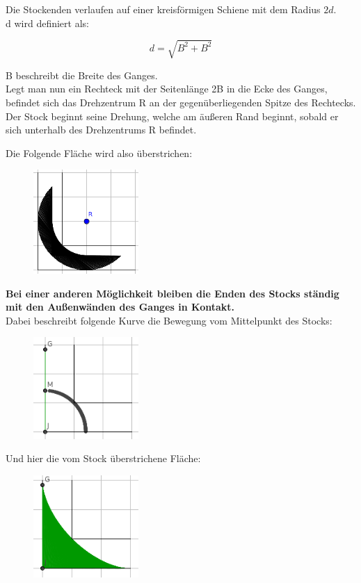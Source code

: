 \documentclass[a4paper,11pt]{article}
\begin{document}
Die Stockenden verlaufen auf einer kreisförmigen Schiene mit dem Radius $2d$. \\
d wird definiert als:

\[ d = \sqrt{B^2+B^2} \]

B beschreibt die Breite des Ganges. \\
Legt man nun ein Rechteck mit der Seitenlänge 2B in die Ecke des Ganges, befindet sich das Drehzentrum R an der gegenüberliegenden Spitze des Rechtecks. \\
Der Stock beginnt seine Drehung, welche am \"au\ss eren Rand beginnt, sobald er sich unterhalb des Drehzentrums R befindet.

Die Folgende Fl\"ache wird also \"uberstrichen:
\begin{figure}[htbp] 
        \centering
        \includegraphics[width=4cm]{img/A4_2.png}
\end{figure}

\textbf{Bei einer anderen M\"oglichkeit bleiben die Enden des Stocks st\"andig mit den Au\ss enw\"anden des Ganges in Kontakt.} \\
Dabei beschreibt folgende Kurve die Bewegung vom Mittelpunkt des Stocks:
\begin{figure}[H] 
        \centering
        \includegraphics[width=4cm]{img/A4_3.png}
\end{figure}

Und hier die vom Stock \"uberstrichene Fl\"ache:
\begin{figure}[H] 
        \centering
        \includegraphics[width=4cm]{img/A4_4.png}
\end{figure}
\end{document}

